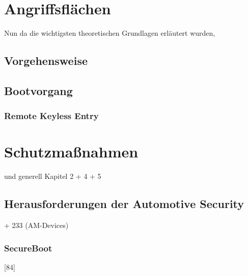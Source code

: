 



\chapter{Angriffsflächen}
Nun da die wichtigsten theoretischen Grundlagen erläutert wurden, 




\section{Vorgehensweise}
\cite[35]{Wurm.2022}

\section{Bootvorgang}
\cite[82]{Wurm.2022}

\subsection{Remote Keyless Entry}
\cite{Garcia.2016}


\chapter{Schutzmaßnahmen}
\cite[42]{Wurm.2022} und generell Kapitel 2 + 4 + 5

%



\section{Herausforderungen der Automotive Security}
\cite[36]{Wurm.2022} + 233 (AM-Devices)

\subsection{SecureBoot}
\cite{Wurm.2022}[84]